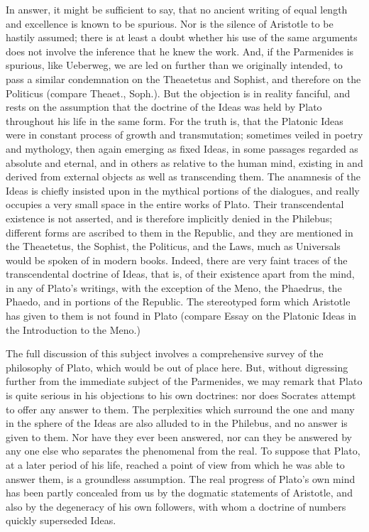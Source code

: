 In answer, it might be sufficient to say, that no ancient writing of
equal length and excellence is known to be spurious. Nor is the silence
of Aristotle to be hastily assumed; there is at least a doubt whether
his use of the same arguments does not involve the inference that he
knew the work. And, if the Parmenides is spurious, like Ueberweg, we
are led on further than we originally intended, to pass a similar
condemnation on the Theaetetus and Sophist, and therefore on the
Politicus (compare Theaet., Soph.). But the objection is in reality
fanciful, and rests on the assumption that the doctrine of the Ideas was
held by Plato throughout his life in the same form. For the truth
is, that the Platonic Ideas were in constant process of growth and
transmutation; sometimes veiled in poetry and mythology, then again
emerging as fixed Ideas, in some passages regarded as absolute and
eternal, and in others as relative to the human mind, existing in
and derived from external objects as well as transcending them. The
anamnesis of the Ideas is chiefly insisted upon in the mythical portions
of the dialogues, and really occupies a very small space in the entire
works of Plato. Their transcendental existence is not asserted, and
is therefore implicitly denied in the Philebus; different forms
are ascribed to them in the Republic, and they are mentioned in the
Theaetetus, the Sophist, the Politicus, and the Laws, much as Universals
would be spoken of in modern books. Indeed, there are very faint traces
of the transcendental doctrine of Ideas, that is, of their existence
apart from the mind, in any of Plato's writings, with the exception of
the Meno, the Phaedrus, the Phaedo, and in portions of the Republic. The
stereotyped form which Aristotle has given to them is not found in Plato
(compare Essay on the Platonic Ideas in the Introduction to the Meno.)

The full discussion of this subject involves a comprehensive survey of
the philosophy of Plato, which would be out of place here. But, without
digressing further from the immediate subject of the Parmenides, we
may remark that Plato is quite serious in his objections to his own
doctrines: nor does Socrates attempt to offer any answer to them. The
perplexities which surround the one and many in the sphere of the Ideas
are also alluded to in the Philebus, and no answer is given to them. Nor
have they ever been answered, nor can they be answered by any one else
who separates the phenomenal from the real. To suppose that Plato, at a
later period of his life, reached a point of view from which he was able
to answer them, is a groundless assumption. The real progress of Plato's
own mind has been partly concealed from us by the dogmatic statements of
Aristotle, and also by the degeneracy of his own followers, with whom a
doctrine of numbers quickly superseded Ideas.

